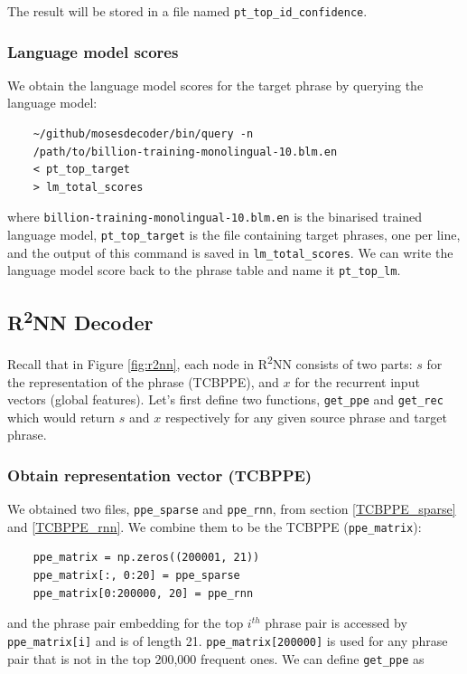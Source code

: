 \documentclass[12pt,a4paper,twoside,openright]{report}
\begin{document}
The result will be stored in a file named \texttt{pt\_top\_id\_confidence}.

\subsubsection{Language model scores}
We obtain the language model scores for the target phrase by querying the language model:
\begin{verbatim}
    ~/github/mosesdecoder/bin/query -n 
    /path/to/billion-training-monolingual-10.blm.en 
    < pt_top_target
    > lm_total_scores
\end{verbatim}

where \texttt{billion-training-monolingual-10.blm.en} is the binarised trained language model, \texttt{pt\_top\_target} is the file containing target phrases, one per line, and the output of this command is saved in \texttt{lm\_total\_scores}. We can write the language model score back to the phrase table and name it \texttt{pt\_top\_lm}.


\subsection{\texorpdfstring{R\textsuperscript{2}NN}{R2NN} Decoder} \label{func_ppe_rec}
Recall that in Figure \ref{fig:r2nn}, each node in R\textsuperscript{2}NN consists of two parts: $s$ for the representation of the phrase (TCBPPE), and $x$ for the recurrent input vectors (global features). Let's first define two functions, \texttt{get\_ppe} and \texttt{get\_rec} which would return $s$ and $x$ respectively for any given source phrase and target phrase.

\subsubsection{Obtain representation vector (TCBPPE)}
We obtained two files, \texttt{ppe\_sparse} and \texttt{ppe\_rnn}, from section \ref{TCBPPE_sparse} and \ref{TCBPPE_rnn}. We combine them to be the TCBPPE (\texttt{ppe\_matrix}):

\begin{verbatim}
    ppe_matrix = np.zeros((200001, 21))
    ppe_matrix[:, 0:20] = ppe_sparse
    ppe_matrix[0:200000, 20] = ppe_rnn
\end{verbatim}

and the phrase pair embedding for the top $i^{th}$ phrase pair is accessed by \texttt{ppe\_matrix[i]} and is of length 21. \texttt{ppe\_matrix[200000]} is used for any phrase pair that is not in the top 200,000 frequent ones. We can define \texttt{get\_ppe} as
\end{document}
